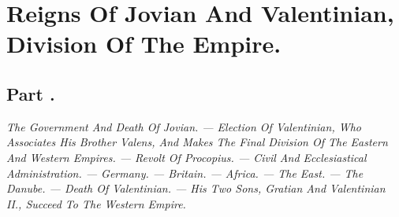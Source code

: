\chapter{Reigns Of Jovian And Valentinian, Division Of The Empire.}
\section{Part \thesection.}

\textit{The Government And Death Of Jovian. — Election Of Valentinian, Who
Associates His Brother Valens, And Makes The Final Division Of The
Eastern And Western Empires. — Revolt Of Procopius. — Civil And
Ecclesiastical Administration. — Germany. — Britain. — Africa. — The
East. — The Danube. — Death Of Valentinian. — His Two Sons, Gratian And
Valentinian II., Succeed To The Western Empire.}
\vspace{\onelineskip}

